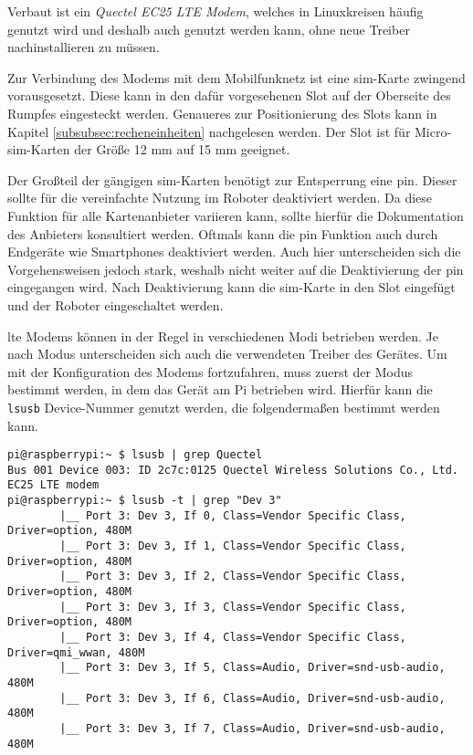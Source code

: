 Verbaut ist ein \emph{Quectel EC25 LTE Modem}, welches in Linuxkreisen häufig genutzt wird und deshalb auch
genutzt werden kann, ohne neue Treiber nachinstallieren zu müssen.


Zur Verbindung des Modems mit dem Mobilfunknetz ist eine \gls{sim}-Karte zwingend vorausgesetzt.
Diese kann in den dafür vorgesehenen Slot auf der Oberseite des Rumpfes eingesteckt werden.
Genaueres zur Positionierung des Slots kann in Kapitel \ref{subsubsec:recheneinheiten} nachgelesen werden.
Der Slot ist für Micro-\gls{sim}-Karten der Größe \num{12} mm auf \num{15} mm geeignet.

Der Großteil der gängigen \gls{sim}-Karten benötigt zur Entsperrung eine \gls{pin}.
Dieser sollte für die vereinfachte Nutzung im Roboter deaktiviert werden.
Da diese Funktion für alle Kartenanbieter variieren kann, sollte hierfür die Dokumentation des Anbieters konsultiert werden.
Oftmals kann die \gls{pin} Funktion auch durch Endgeräte wie Smartphones deaktiviert werden.
Auch hier unterscheiden sich die Vorgehensweisen jedoch stark, weshalb nicht weiter auf die Deaktivierung der \gls{pin}
eingegangen wird.
Nach Deaktivierung kann die \gls{sim}-Karte in den Slot eingefügt und der Roboter eingeschaltet werden.



\gls{lte} Modems können in der Regel in verschiedenen Modi betrieben werden.
Je nach Modus unterscheiden sich auch die verwendeten Treiber des Gerätes.
Um mit der Konfiguration des Modems fortzufahren, muss zuerst der Modus bestimmt werden, in dem das Gerät am Pi betrieben wird.
Hierfür kann die \texttt{lsusb} Device-Nummer genutzt werden, die folgendermaßen bestimmt werden kann.

\begin{lstlisting}
pi@raspberrypi:~ $ lsusb | grep Quectel
Bus 001 Device 003: ID 2c7c:0125 Quectel Wireless Solutions Co., Ltd. EC25 LTE modem
pi@raspberrypi:~ $ lsusb -t | grep "Dev 3"
        |__ Port 3: Dev 3, If 0, Class=Vendor Specific Class, Driver=option, 480M
        |__ Port 3: Dev 3, If 1, Class=Vendor Specific Class, Driver=option, 480M
        |__ Port 3: Dev 3, If 2, Class=Vendor Specific Class, Driver=option, 480M
        |__ Port 3: Dev 3, If 3, Class=Vendor Specific Class, Driver=option, 480M
        |__ Port 3: Dev 3, If 4, Class=Vendor Specific Class, Driver=qmi_wwan, 480M
        |__ Port 3: Dev 3, If 5, Class=Audio, Driver=snd-usb-audio, 480M
        |__ Port 3: Dev 3, If 6, Class=Audio, Driver=snd-usb-audio, 480M
        |__ Port 3: Dev 3, If 7, Class=Audio, Driver=snd-usb-audio, 480M
\end{lstlisting}

